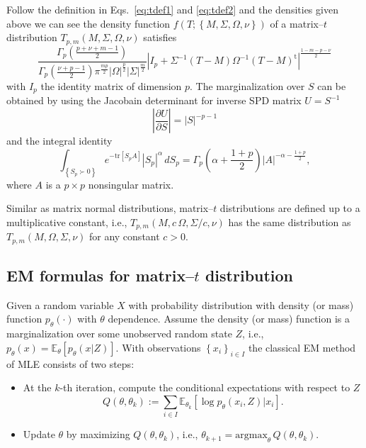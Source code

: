 \documentclass[english,listof=totoc]{scrartcl}
\begin{document}
Follow the definition in Eqs.~\eqref{eq:tdef1} and \eqref{eq:tdef2} and the densities given above we can see the density function $f(T;\left\{M,\Sigma,\Omega,\nu\right\})$ of a matrix--$t$ distribution $T_{p,m}(M,\Sigma,\Omega,\nu)$ satisfies
\begin{equation}
\frac{\Gamma_{p}\left(\frac{p+\nu+m-1}{2}\right)}{\Gamma_{p}\left(\frac{\nu+p-1}{2}\right)\pi^{\frac{mp}{2}}|\Omega|^{\frac{p}{2}}|\Sigma|^{\frac{m}{2}}}
|I_p+\Sigma^{-1}(T-M)\Omega^{-1}(T-M)^{\textrm{t}}|^{\frac{1-m-p-\nu}{2}}
\label{eq:matrixtpdf}
\end{equation}
with $I_p$ the identity matrix of dimension $p$. The marginalization over $S$ can be obtained by using the Jacobain determinant for inverse SPD matrix $U=S^{-1}$
\begin{equation}
\left|\frac{\partial U}{\partial S}\right|=|S|^{-p-1}
\end{equation}
and the integral identity \citep{gupta1999matrix}
\begin{equation}
\int_{\left\{S_p\succ 0\right\}}e^{-\textrm{tr}[S_pA]}|S_p|^{\alpha}\,dS_p=\Gamma_{p}\left(\alpha+\frac{1+p}{2}\right)|A|^{-\alpha-\frac{1+p}{2}},\label{eq:intmultgammadef}
\end{equation}
where $A$ is a $p\times p$ nonsingular matrix.

Similar as matrix normal distributions, matrix--$t$ distributions are defined up to a multiplicative constant, i.e., $T_{p,m}(M,c\,\Omega,\Sigma/c,\nu)$ has the same distribution as $T_{p,m}(M,\Omega,\Sigma,\nu)$ for any constant $c>0$.

\subsection{EM formulas for matrix--$t$ distribution}

Given a random variable $X$ with probability distribution with density (or mass) function $p_{\theta}(\cdot)$ with $\theta$ dependence. Assume the density (or mass) function is a marginalization over some unobserved random state $Z$, i.e., $p_{\theta}(x)=\mathbb{E}_{\theta}\left[p_{\theta}(x|Z)\right]$. With observations $\left\{x_i\right\}_{i\in I}$ the classical EM method of MLE consists of two steps:

\begin{itemize}
\item At the $k$-th iteration, compute the conditional expectations with respect to $Z$
\begin{equation}
Q(\theta,\theta_k):=\sum_{i\in I}\mathbb{E}_{\theta_k}\left[\log p_{\theta}(x_i,Z)|x_i\right].
\end{equation}

\item Update $\theta$ by maximizing $Q(\theta,\theta_k)$, i.e., $\theta_{k+1} = \textrm{argmax}_{\theta}\,Q(\theta,\theta_k)$.
\end{itemize}
\end{document}
